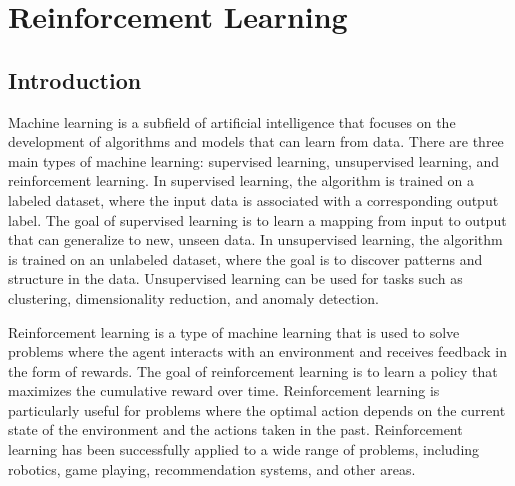 \chapter{Reinforcement Learning}\label{chap:reinforcement}



\section{Introduction}\label{sec:rl-intro}
Machine learning is a subfield of artificial intelligence that focuses on the development of algorithms and models that can learn from data. There are three main types of machine learning: supervised learning, unsupervised learning, and reinforcement learning. In supervised learning, the algorithm is trained on a labeled dataset, where the input data is associated with a corresponding output label. The goal of supervised learning is to learn a mapping from input to output that can generalize to new, unseen data. In unsupervised learning, the algorithm is trained on an unlabeled dataset, where the goal is to discover patterns and structure in the data. Unsupervised learning can be used for tasks such as clustering\cite{}, dimensionality reduction\cite{}, and anomaly detection\cite{}.

Reinforcement learning is a type of machine learning that is used to solve problems where the agent interacts with an environment and receives feedback in the form of rewards. The goal of reinforcement learning is to learn a policy that maximizes the cumulative reward over time. Reinforcement learning is particularly useful for problems where the optimal action depends on the current state of the environment and the actions taken in the past. Reinforcement learning has been successfully applied to a wide range of problems, including robotics\cite{}, game playing\cite{}, recommendation systems\cite{}, and other areas.

